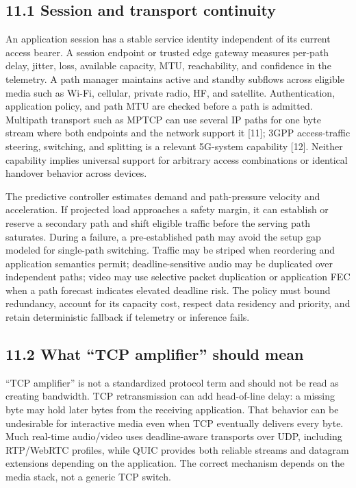 \documentclass[
  american,
  11pt,
]{article}
\begin{document}
\subsection{11.1 Session and transport
continuity}\label{session-and-transport-continuity}

An application session has a stable service identity independent of its
current access bearer. A session endpoint or trusted edge gateway
measures per-path delay, jitter, loss, available capacity, MTU,
reachability, and confidence in the telemetry. A path manager maintains
active and standby subflows across eligible media such as Wi-Fi,
cellular, private radio, HF, and satellite. Authentication, application
policy, and path MTU are checked before a path is admitted. Multipath
transport such as MPTCP can use several IP paths for one byte stream
where both endpoints and the network support it {[}11{]}; 3GPP
access-traffic steering, switching, and splitting is a relevant
5G-system capability {[}12{]}. Neither capability implies universal
support for arbitrary access combinations or identical handover behavior
across devices.

The predictive controller estimates demand and path-pressure velocity
and acceleration. If projected load approaches a safety margin, it can
establish or reserve a secondary path and shift eligible traffic before
the serving path saturates. During a failure, a pre-established path may
avoid the setup gap modeled for single-path switching. Traffic may be
striped when reordering and application semantics permit;
deadline-sensitive audio may be duplicated over independent paths; video
may use selective packet duplication or application FEC when a path
forecast indicates elevated deadline risk. The policy must bound
redundancy, account for its capacity cost, respect data residency and
priority, and retain deterministic fallback if telemetry or inference
fails.

\subsection{11.2 What ``TCP amplifier'' should
mean}\label{what-tcp-amplifier-should-mean}

``TCP amplifier'' is not a standardized protocol term and should not be
read as creating bandwidth. TCP retransmission can add head-of-line
delay: a missing byte may hold later bytes from the receiving
application. That behavior can be undesirable for interactive media even
when TCP eventually delivers every byte. Much real-time audio/video uses
deadline-aware transports over UDP, including RTP/WebRTC profiles, while
QUIC provides both reliable streams and datagram extensions depending on
the application. The correct mechanism depends on the media stack, not a
generic TCP switch.
\end{document}
